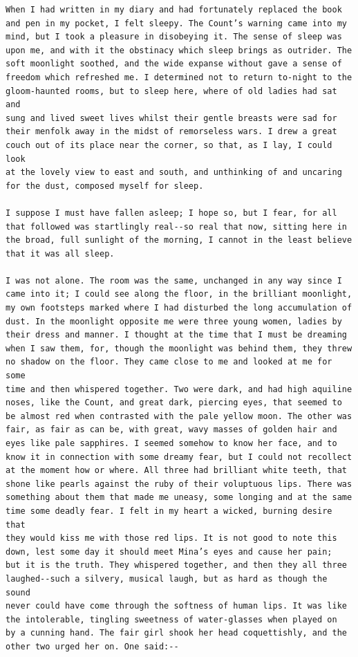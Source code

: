 \documentclass{article}
\begin{document}
\begin{verbatim}
When I had written in my diary and had fortunately replaced the book
and pen in my pocket, I felt sleepy. The Count’s warning came into my
mind, but I took a pleasure in disobeying it. The sense of sleep was
upon me, and with it the obstinacy which sleep brings as outrider. The
soft moonlight soothed, and the wide expanse without gave a sense of
freedom which refreshed me. I determined not to return to-night to the
gloom-haunted rooms, but to sleep here, where of old ladies had sat and
sung and lived sweet lives whilst their gentle breasts were sad for
their menfolk away in the midst of remorseless wars. I drew a great
couch out of its place near the corner, so that, as I lay, I could look
at the lovely view to east and south, and unthinking of and uncaring
for the dust, composed myself for sleep.

I suppose I must have fallen asleep; I hope so, but I fear, for all
that followed was startlingly real--so real that now, sitting here in
the broad, full sunlight of the morning, I cannot in the least believe
that it was all sleep.

I was not alone. The room was the same, unchanged in any way since I
came into it; I could see along the floor, in the brilliant moonlight,
my own footsteps marked where I had disturbed the long accumulation of
dust. In the moonlight opposite me were three young women, ladies by
their dress and manner. I thought at the time that I must be dreaming
when I saw them, for, though the moonlight was behind them, they threw
no shadow on the floor. They came close to me and looked at me for some
time and then whispered together. Two were dark, and had high aquiline
noses, like the Count, and great dark, piercing eyes, that seemed to
be almost red when contrasted with the pale yellow moon. The other was
fair, as fair as can be, with great, wavy masses of golden hair and
eyes like pale sapphires. I seemed somehow to know her face, and to
know it in connection with some dreamy fear, but I could not recollect
at the moment how or where. All three had brilliant white teeth, that
shone like pearls against the ruby of their voluptuous lips. There was
something about them that made me uneasy, some longing and at the same
time some deadly fear. I felt in my heart a wicked, burning desire that
they would kiss me with those red lips. It is not good to note this
down, lest some day it should meet Mina’s eyes and cause her pain;
but it is the truth. They whispered together, and then they all three
laughed--such a silvery, musical laugh, but as hard as though the sound
never could have come through the softness of human lips. It was like
the intolerable, tingling sweetness of water-glasses when played on
by a cunning hand. The fair girl shook her head coquettishly, and the
other two urged her on. One said:--


\end{verbatim}
\end{document}
